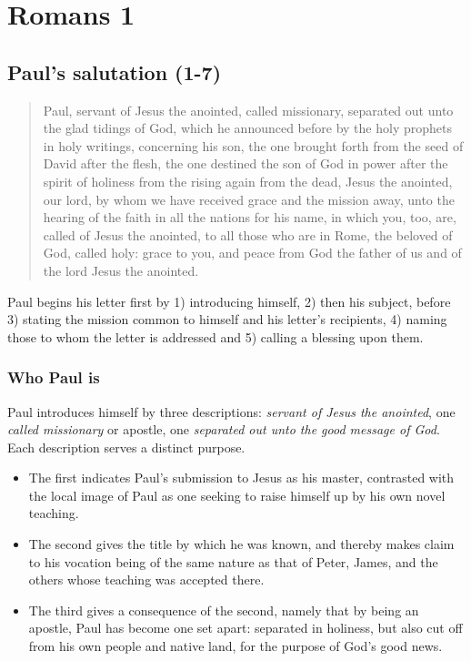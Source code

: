 \chapter{Romans 1}
\section{Paul's salutation (1-7)}
\begin{quote}
	Paul, servant of Jesus the anointed, called missionary, separated out unto the glad tidings of God, which he announced before by the holy prophets in holy writings, concerning his son, the one brought forth from the seed of David after the flesh, the one destined the son of God in power after the spirit of holiness from the rising again from the dead, Jesus the anointed, our lord, by whom we have received grace and the mission away, unto the hearing of the faith in all the nations for his name, in which you, too, are, called of Jesus the anointed, to all those who are in Rome, the beloved of God, called holy: grace to you, and peace from God the father of us and of the lord Jesus the anointed.
\end{quote}

Paul begins his letter first by 1) introducing himself, 2) then his subject, before 3) stating the mission common to himself and his letter's recipients, 4) naming those to whom the letter is addressed and 5) calling a blessing upon them. 

\subsection{Who Paul is}
Paul introduces himself by three descriptions: \emph{servant of Jesus the anointed}, one \emph{called missionary} or apostle, one \emph{separated out unto the good message of God}. Each description serves a distinct purpose. 
\begin{itemize}
	\item The first indicates Paul's submission to Jesus as his master, contrasted with the local image of Paul as one seeking to raise himself up by his own novel teaching. 
	\item The second gives the title by which he was known, and thereby makes claim to his vocation being of the same nature as that of Peter, James, and the others whose teaching was accepted there.
	\item The third gives a consequence of the second, namely that by being an apostle, Paul has become one set apart: separated in holiness, but also cut off from his own people and native land, for the purpose of God's good news. 
\end{itemize}



